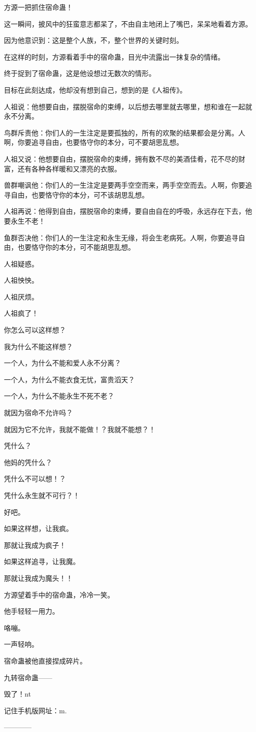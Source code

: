 \begin{this_body}
方源一把抓住宿命蛊！

这一瞬间，披风中的狂蛮意志都呆了，不由自主地闭上了嘴巴，呆呆地看着方源。

因为他意识到：这是整个人族，不，整个世界的关键时刻。

在这样的时刻，方源看着手中的宿命蛊，目光中流露出一抹复杂的情绪。

终于捉到了宿命蛊，这是他设想过无数次的情形。

目标在此刻达成，他却没有想到自己，想到的是《人祖传》。

人祖说：他想要自由，摆脱宿命的束缚，以后想去哪里就去哪里，想和谁在一起就永不分离。

鸟群斥责他：你们人的一生注定是要孤独的，所有的欢聚的结果都会是分离。人啊，你要追寻自由，也要恪守你的本分，可不要胡思乱想。

人祖又说：他想要自由，摆脱宿命的束缚，拥有数不尽的美酒佳肴，花不尽的财富，还有各种各样暖和又漂亮的衣服。

兽群嘲讽他：你们人的一生注定是要两手空空而来，两手空空而去。人啊，你要追寻自由，也要恪守你的本分，可不该胡思乱想。

人祖再说：他得到自由，摆脱宿命的束缚，要自由自在的呼吸，永远存在下去，他要永生不老！

鱼群否决他：你们人的一生注定和永生无缘，将会生老病死。人啊，你要追寻自由，也要恪守你的本分，可不能胡思乱想。

人祖疑惑。

人祖怏怏。

人祖厌烦。

人祖疯了！

你怎么可以这样想？

我为什么不能这样想？

一个人，为什么不能和爱人永不分离？

一个人，为什么不能衣食无忧，富贵滔天？

一个人，为什么不能永生不死不老？

就因为宿命不允许吗？

就因为它不允许，我就不能做！？我就不能想？！

凭什么？

他妈的凭什么？

凭什么不可以想！？

凭什么永生就不可行？！

好吧。

如果这样想，让我疯。

那就让我成为疯子！

如果这样追寻，让我魔。

那就让我成为魔头！！

方源望着手中的宿命蛊，冷冷一笑。

他手轻轻一用力。

咯嘣。

一声轻响。

宿命蛊被他直接捏成碎片。

九转宿命蛊——

毁了！nt

记住手机版网址：m.

------------

\end{this_body}

